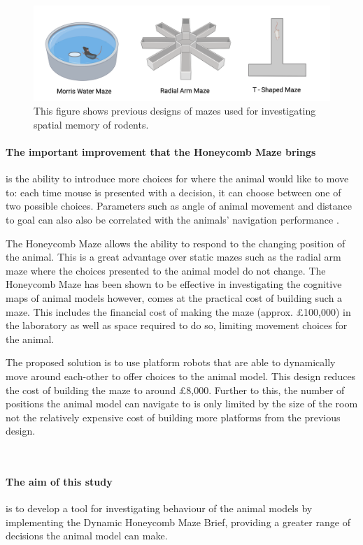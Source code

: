\begin{figure}[h]
    \centering
    \includegraphics[scale=0.4]{images/previous_maze_designs.png}
    \caption{This figure shows previous designs of mazes used for investigating spatial memory of rodents.}
    \label{fig:previous_maze_designs}
\end{figure}

\paragraph{The important improvement that the Honeycomb Maze brings} is the ability to introduce more choices for where the animal would like to move to: each time mouse is presented with a decision, it can choose between one of two possible choices.  Parameters such as angle of animal movement and distance to goal can also also be correlated with the animals' navigation performance \cite{nature_honeycomb_maze_paper}. 

The Honeycomb Maze allows the ability to respond to the changing position of the animal. This is a great advantage over static mazes such as the radial arm maze where the choices presented to the animal model do not change.
The Honeycomb Maze has been shown to be effective in investigating the cognitive maps of animal models \cite{nature_honeycomb_maze_paper} however, comes at the practical cost of building such a maze. This includes the financial cost of making the maze (approx. £100,000) in the laboratory as well as space required to do so, limiting movement choices for the animal.

The proposed solution is to use platform robots that are able to dynamically move around each-other to offer choices to the animal model. This design reduces the cost of building the maze to around £8,000. Further to this, the number of positions the animal model can navigate to is only limited by the size of the room not the relatively expensive cost of building more platforms from the previous design.

\\

\paragraph{The aim of this study} is to develop a tool for investigating behaviour of the animal models by implementing the Dynamic Honeycomb Maze Brief, providing a greater range of decisions the animal model can make.

